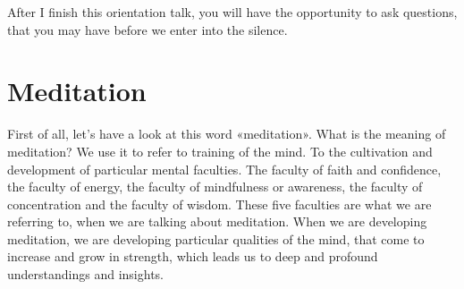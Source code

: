 \documentclass[letterpaper,10pt,english]{sphinxmanual}
\begin{document}
\sphinxAtStartPar
After I finish this orientation talk, you will have the opportunity to ask
questions, that you may have before we enter into the silence.


\section{Meditation}
\label{\detokenize{0-a:meditation}}
\sphinxAtStartPar
First  of  all,  let’s  have  a  look  at  this  word  «meditation».  What  is  the
meaning of meditation? We use it to refer to training of the mind. To the cultivation and development of particular mental faculties. The faculty of faith
and confidence, the faculty of energy, the faculty of mindfulness or awareness, the faculty of concentration and the faculty of wisdom. These five faculties are what we are referring to, when we are talking about meditation.
When we are developing meditation, we are developing particular qualities
of the mind, that come to increase and grow in strength, which leads us to
deep and profound understandings and insights.
\end{document}
